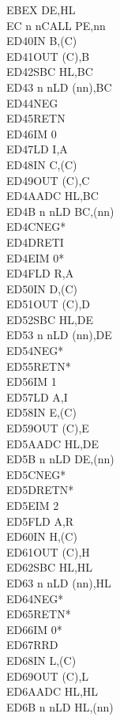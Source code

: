 \documentclass[oneside,a4paper]{book}
\begin{document}
\begin{multicols}{3}
{\begin{tabbing}
EB\>EX DE,HL\\
EC n n\>CALL PE,nn\\
ED40\>IN B,(C)\\
ED41\>OUT (C),B\\
ED42\>SBC HL,BC\\
ED43 n n\>LD (nn),BC\\
ED44\>NEG\\
ED45\>RETN\\
ED46\>IM 0\\
ED47\>LD I,A\\
ED48\>IN C,(C)\\
ED49\>OUT (C),C\\
ED4A\>ADC HL,BC\\
ED4B n n\>LD BC,(nn)\\
ED4C\>NEG*\\
ED4D\>RETI\\
ED4E\>IM 0*\\
ED4F\>LD R,A\\
ED50\>IN D,(C)\\
ED51\>OUT (C),D\\
ED52\>SBC HL,DE\\
ED53 n n\>LD (nn),DE\\
ED54\>NEG*\\
ED55\>RETN*\\
ED56\>IM 1\\
ED57\>LD A,I\\
ED58\>IN E,(C)\\
ED59\>OUT (C),E\\
ED5A\>ADC HL,DE\\
ED5B n n\>LD DE,(nn)\\
ED5C\>NEG*\\
ED5D\>RETN*\\
ED5E\>IM 2\\
ED5F\>LD A,R\\
ED60\>IN H,(C)\\
ED61\>OUT (C),H\\
ED62\>SBC HL,HL\\
ED63 n n\>LD (nn),HL\\
ED64\>NEG*\\
ED65\>RETN*\\
ED66\>IM 0*\\
ED67\>RRD\\
ED68\>IN L,(C)\\
ED69\>OUT (C),L\\
ED6A\>ADC HL,HL\\
ED6B n n\>LD HL,(nn)\\

\end{tabbing}}
\end{multicols}
\end{document}
